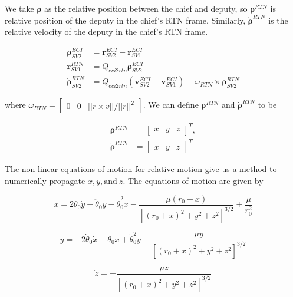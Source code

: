 We take $\boldsymbol{\rho}$ as the relative position between the chief and deputy, so $\boldsymbol{\rho}^{RTN}$ is relative position of the deputy in the chief's RTN frame. Similarly, $\boldsymbol{\dot{\rho}}^{RTN}$ is the relative velocity of the deputy in the chief's RTN frame.

\begin{align}
    \boldsymbol{\rho}_{SV2}^{ECI} &= \boldsymbol{r}^{ECI}_{SV2} - \boldsymbol{r}^{ECI}_{SV1}\\
    \boldsymbol{r}^{RTN}_{SV1} &= Q_{eci2rtn} \boldsymbol{\rho}_{SV2}^{ECI} \\
    \boldsymbol{\dot{\rho}}^{RTN}_{SV2} &= Q_{eci2rtn} \left(\boldsymbol{v}^{ECI}_{SV2} - \boldsymbol{v}^{ECI}_{SV1}\right)  - \omega_{RTN} \times \boldsymbol{\rho}^{RTN}_{SV2} \label{eq:v_rtn_rel}
\end{align}

where $\omega_{RTN} = \begin{bmatrix}
    0 & 0 & ||r\times v ||/||r||^2
\end{bmatrix}$. We can define $\boldsymbol{\rho}^{RTN}$ and $\boldsymbol{\dot{\rho}}^{RTN}$ to be

\begin{align}
    \boldsymbol{\rho}^{RTN} &= \begin{bmatrix}
        x & y & z
    \end{bmatrix}^T, \\
    \boldsymbol{\dot{\rho}}^{RTN} &= \begin{bmatrix}
        \dot{x} & \dot{y} & \dot{z}
    \end{bmatrix}^T 
\end{align}

The non-linear equations of motion for relative motion give us a method to numerically propagate $x, y, \text{and} \ z$. The equations of motion are given by

\begin{equation*}
\ddot{x} = 2\dot{\theta}_0 \dot{y} + \ddot{\theta}_0 y - \dot{\theta}_0^2 x -\frac{\mu (r_0 + x)}{\left[(r_0 + x)^2 + y^2 + z^2\right]^{3/2}} + \frac{\mu}{r_0^2}
\end{equation*}

\begin{equation*}
\ddot{y} = - 2\dot{\theta}_0 \dot{x} - \ddot{\theta}_0 x + \dot{\theta}_0^2 y  -\frac{\mu y}{\left[(r_0 + x)^2 + y^2 + z^2\right]^{3/2}}
\end{equation*}

\begin{equation*}
\ddot{z} = -\frac{\mu z}{\left[(r_0 + x)^2 + y^2 + z^2\right]^{3/2}}
\end{equation*}

